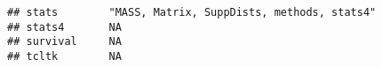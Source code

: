 \documentclass[]{book}
\begin{document}
\begin{verbatim}
## stats        "MASS, Matrix, SuppDists, methods, stats4"                                                                                                                                                                                                                                                                                                                                                                                                                                                                                                                                                                                                                                                                
## stats4       NA                                                                                                                                                                                                                                                                                                                                                                                                                                                                                                                                                                                                                                                                                                        
## survival     NA                                                                                                                                                                                                                                                                                                                                                                                                                                                                                                                                                                                                                                                                                                        
## tcltk        NA                                                                                                                                                                                                                                                                                                                                                                                                                                                                                                                                                                                                                                                                                                        

\end{verbatim}
\end{document}
